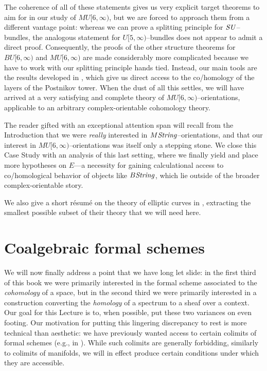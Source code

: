 The coherence of all of these statements gives us very explicit target theorems to aim for in our study of \(MU[6, \infty)\), but we are forced to approach them from a different vantage point: whereas we can prove a splitting principle for \(\mathit{SU}\)--bundles, the analogous statement for \(U[5, \infty)\)--bundles does not appear to admit a direct proof.  Consequently, the proofs of the other structure theorems for \(BU[6, \infty)\) and \(MU[6, \infty)\) are made considerably more complicated because we have to work with our splitting principle hands tied.  Instead, our main tools are the results developed in , which give us direct access to the co/homology of the layers of the Postnikov tower.  When the dust of all this settles, we will have arrived at a very satisfying and complete theory of \(MU[6, \infty)\)--orientations, applicable to an arbitrary complex-orientable cohomology theory.

The reader gifted with an exceptional attention span will recall from the Introduction that we were \emph{really} interested in \(M\mathit{String}\)--orientations, and that our interest in \(MU[6, \infty)\)--orientations was itself only a stepping stone.  We close this Case Study with an analysis of this last setting, where we finally yield and place more hypotheses on \(E\)---a necessity for gaining calculational access to co/homological behavior of objects like \(B\mathit{String}\), which lie outside of the broader complex-orientable story.

We also give a short r\'esum\'e on the theory of elliptic curves in , extracting the smallest possible subset of their theory that we will need here.









\section{Coalgebraic formal schemes}

We will now finally address a point that we have long let slide: in the first third of this book we were primarily interested in the formal scheme associated to the \emph{cohomology} of a space, but in the second third we were primarily interested in a construction converting the \emph{homology} of a spectrum to a sheaf over a context.  Our goal for this Lecture is to, when possible, put these two variances on even footing.  Our motivation for putting this lingering discrepancy to rest is more technical than aesthetic: we have previously wanted access to certain colimits of formal schemes (e.g., in ).  While such colimits are generally forbidding, similarly to colimits of manifolds, we will in effect produce certain conditions under which they are accessible.

